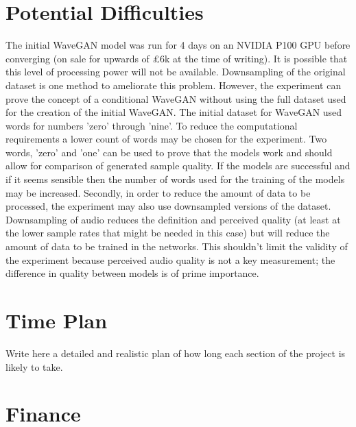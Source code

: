 \documentclass[a4paper, titlepage]{article}
\begin{document}
\newpage

\section{Potential Difficulties}

The initial WaveGAN model was run for 4 days on an NVIDIA P100 GPU before converging (on sale for upwards of £6k at the time of writing).
It is possible that this level of processing power will not be available.
Downsampling of the original dataset is one method to ameliorate this problem.
\newline
\newline
However, the experiment can prove the concept of a conditional WaveGAN without using the full dataset used for the creation of the initial WaveGAN.
The initial dataset for WaveGAN used words for numbers 'zero' through 'nine'.
To reduce the computational requirements a lower count of words may be chosen for the experiment.
Two words, 'zero' and 'one' can be used to prove that the models work and should allow for comparison of generated sample quality.
If the models are successful and if it seems sensible then the number of words used for the training of the models may be increased.
\newline
\newline
Secondly, in order to reduce the amount of data to be processed, the experiment may also use downsampled versions of the dataset.
Downsampling of audio reduces the definition and perceived quality (at least at the lower sample rates that might be needed in this case) but will reduce the amount of data to be trained in the networks.
This shouldn't limit the validity of the experiment because perceived audio quality is not a key measurement; the difference in quality between models is of prime importance.

\newpage

\section{Time Plan}

Write here a detailed and realistic plan of how long each section of the project is likely to take.

\newpage

\section{Finance}
\end{document}

